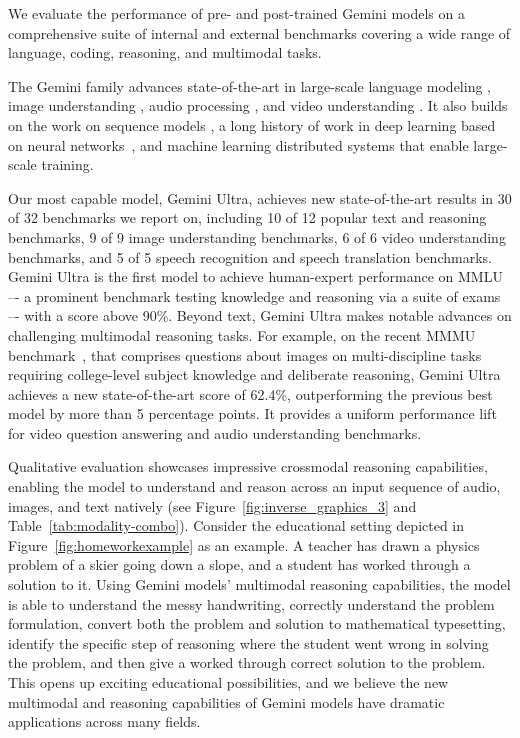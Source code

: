 We evaluate the performance of pre- and post-trained Gemini models on a comprehensive suite of internal and external benchmarks covering a wide range of language, coding, reasoning, and multimodal tasks.

The Gemini family advances state-of-the-art in large-scale language modeling \citep{gpt2, gpt3, gopher, palm, chinchilla, palm2, gpt4}, image understanding \citep{vit, pali, coca, flamingo, gato, gpt4v}, audio processing \citep{whisper, usm}, and video understanding \citep{flamingo, palix}. It also builds on the work on sequence models \cite{sutskever2014sequence}, a long history of work in deep learning based on neural networks~\citep{lecun2015deep}, and machine learning distributed systems \cite{distbelief,jax,pathways} that enable large-scale training. 

Our most capable model, Gemini Ultra, achieves new state-of-the-art results in 30 of 32 benchmarks we report on, including 10 of 12 popular text and reasoning benchmarks, 9 of 9 image understanding benchmarks, 6 of 6 video understanding benchmarks, and 5 of 5 speech recognition and speech translation benchmarks. Gemini Ultra is the first model to achieve human-expert performance on MMLU \citep{mmlu} –- a prominent benchmark testing knowledge and reasoning via a suite of exams –- with a score above 90\%.
Beyond text, Gemini Ultra makes notable advances on challenging multimodal reasoning tasks. For example, on the recent MMMU benchmark~\cite{mmmu}, that comprises questions about images on multi-discipline tasks requiring college-level subject knowledge and deliberate reasoning, Gemini Ultra achieves a new state-of-the-art score of 62.4\%, outperforming the previous best model by more than 5 percentage points. It provides a uniform performance lift for video question answering and audio understanding benchmarks.

Qualitative evaluation showcases impressive crossmodal reasoning capabilities, enabling the model to understand and reason across an input sequence of audio, images, and text natively (see Figure~\ref{fig:inverse_graphics_3} and Table~\ref{tab:modality-combo}). Consider the educational setting depicted in Figure~\ref{fig:homeworkexample} as an example. A teacher has drawn a physics problem of a skier going down a slope, and a student has worked through a solution to it. Using Gemini models' multimodal reasoning capabilities, the model is able to understand the messy handwriting, correctly understand the problem formulation, convert both the problem and solution to mathematical typesetting, identify the specific step of reasoning where the student went wrong in solving the problem, and then give a worked through correct solution to the problem. This opens up exciting educational possibilities, and we believe the new multimodal and reasoning capabilities of Gemini models have dramatic applications across many fields.

